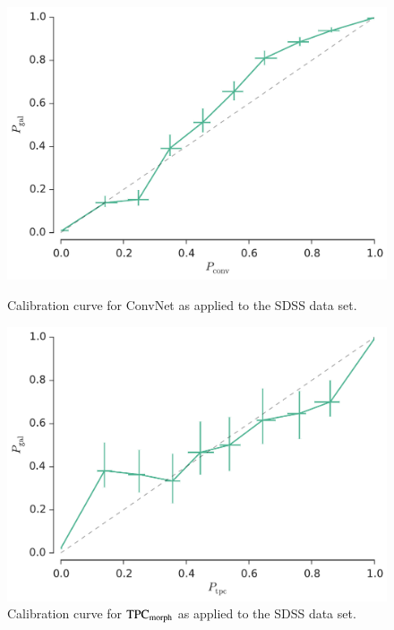 \documentclass[fleqn,usenatbib]{mnras}
\begin{document}
\begin{figure}
  \centering
  \begin{minipage}[c]{0.49\textwidth}
    \centering
    \includegraphics[width=\textwidth]{figures/sdss_calibration_conv.pdf}
    \caption{Calibration curve for ConvNet as applied to the SDSS data set.}
    \label{fig:sdss_calibration_conv}
  \end{minipage}
  \hfill
  \begin{minipage}[c]{0.49\textwidth}
    \centering
    \includegraphics[width=\textwidth]{figures/sdss_calibration_tpc.pdf}
    \caption{Calibration curve for ${\mathrm{TPC}}_{{\mathrm{morph}}}$
      as applied to the SDSS data set.}
    \label{fig:sdss_calibration_tpc}
  \end{minipage}
\end{figure}
\end{document}
